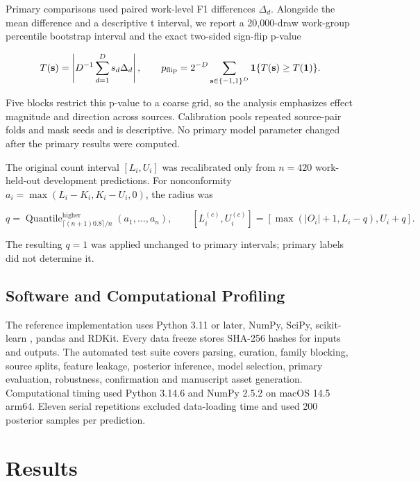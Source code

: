 \documentclass[11pt]{article}
\begin{document}
Primary comparisons used paired work-level F1 differences \(\Delta_d\). Alongside the mean difference and a descriptive t interval, we report a 20,000-draw work-group percentile bootstrap interval and the exact two-sided sign-flip p-value

\begin{equation}
\label{eq:sign-flip-test}
T(\mathbf s)=\left|D^{-1}\sum_{d=1}^{D}s_d\Delta_d\right|,\qquad p_{\mathrm{flip}}=2^{-D}\sum_{\mathbf s\in\{-1,1\}^{D}}{\bf1}\{T(\mathbf s)\ge T(\mathbf 1)\}.
\end{equation}

Five blocks restrict this p-value to a coarse grid, so the analysis emphasizes effect magnitude and direction across sources. Calibration pools repeated source-pair folds and mask seeds and is descriptive. No primary model parameter changed after the primary results were computed.

The original count interval \([L_i,U_i]\) was recalibrated only from \(n=420\) work-held-out development predictions. For nonconformity \(a_i=\max(L_i-K_i,K_i-U_i,0)\), the radius was

\begin{equation}
\label{eq:count-conformal}
q=\operatorname{Quantile}_{\lceil(n+1)0.8\rceil/n}^{\mathrm{higher}}(a_1,\ldots,a_n),\qquad [L_i^{(c)},U_i^{(c)}]=[\max(|O_i|+1,L_i-q),U_i+q].
\end{equation}

The resulting \(q=1\) was applied unchanged to primary intervals; primary labels did not determine it.

\subsection{Software and Computational Profiling}

The reference implementation uses Python 3.11 or later, NumPy, SciPy, scikit-learn \cite{ref21}, pandas and RDKit. Every data freeze stores SHA-256 hashes for inputs and outputs. The automated test suite covers parsing, curation, family blocking, source splits, feature leakage, posterior inference, model selection, primary evaluation, robustness, confirmation and manuscript asset generation. Computational timing used Python 3.14.6 and NumPy 2.5.2 on macOS 14.5 arm64. Eleven serial repetitions excluded data-loading time and used 200 posterior samples per prediction.

\section{Results}
\end{document}
